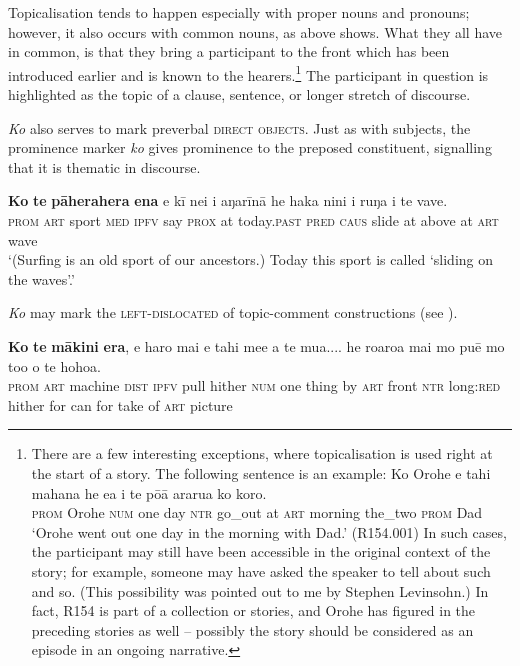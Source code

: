 Topicalisation tends to happen especially with proper nouns and pronouns; however, it also occurs with common nouns, as  above shows. What they all have in common, is that they bring a participant to the front which has been introduced earlier and is known to the hearers.\footnote{\label{fn:424}There are a few interesting exceptions, where topicalisation is used right at the start of a story. The following sentence is an example:
\ea
\gll Ko {\ꞌ}Orohe e tahi mahana he e{\ꞌ}a {\ꞌ}i te pō{\ꞌ}ā ararua ko koro.\\
  \textsc{prom} Orohe \textsc{num} one day \textsc{ntr} go\_out at \textsc{art} morning the\_two \textsc{prom} Dad\\
  \glt 
  ‘Orohe went out one day in the morning with Dad.’ (R154.001)\z
In such cases, the participant may still have been accessible in the original context of the story; for example, someone may have asked the speaker to tell about such and so. (This possibility was pointed out to me by Stephen Levinsohn.) In fact, R154 is part of a collection or stories, and Orohe has figured in the preceding stories as well – possibly the story should be considered as an episode in an ongoing narrative.} The participant in question is highlighted as the topic of a clause, sentence, or longer stretch of discourse.

\textit{Ko} also serves to mark preverbal \textsc{direct objects}. Just as with subjects, the prominence marker \textit{ko} gives prominence to the preposed constituent, signalling that it is thematic in discourse.

\ea\label{ex:8.85}
\gll \textbf{Ko} \textbf{te} \textbf{pāherahera} \textbf{ena} e kī nei {\ꞌ}i {\ꞌ}aŋarīnā he haka nini  {\ꞌ}i ruŋa i te vave.\\
\textsc{prom} \textsc{art} sport \textsc{med} \textsc{ipfv} say \textsc{prox} at today.\textsc{past} \textsc{pred} \textsc{caus} slide  at above at \textsc{art} wave\\

\glt 
‘(Surfing is an old sport of our ancestors.) Today this sport is called ‘sliding on the waves’.’ \textstyleExampleref{[R645.003]} 
\z

\textit{Ko} may mark the \textsc{left-dislocated}  of topic-comment constructions (see ).


\ea\label{ex:8.86}
\gll \textbf{Ko} \textbf{te} \textbf{mākini} \textbf{era}, e haro mai e tahi me{\ꞌ}e a te mu{\ꞌ}a.... he roaroa mai mo puē mo to{\ꞌ}o o te hoho{\ꞌ}a.\\
\textsc{prom} \textsc{art} machine \textsc{dist} \textsc{ipfv} pull hither \textsc{num} one thing by \textsc{art} front \textsc{ntr} long:\textsc{red} hither for can for take of \textsc{art} picture\\

